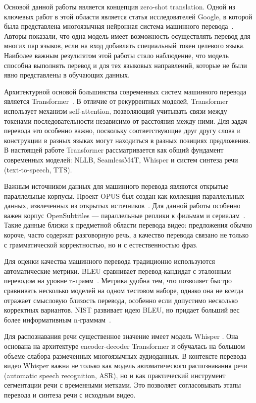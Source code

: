 \documentclass[a4paper,article,14pt]{extarticle}
\begin{document}
\newpage
{}

Основой данной работы является концепция zero-shot translation. Одной из ключевых работ в этой области является статья исследователей Google, в которой была представлена многоязычная нейронная система машинного перевода~\cite{Google}. Авторы показали, что одна модель имеет возможность осуществлять перевод для многих пар языков, если на вход добавлять специальный токен целевого языка. Наиболее важным результатом этой работы стало наблюдение, что модель способна выполнять перевод и для тех языковых направлений, которые не были явно представлены в обучающих данных.

Архитектурной основой большинства современных систем машинного перевода является Transformer~\cite{Attention}. В отличие от рекуррентных моделей, Transformer использует механизм self-attention, позволяющий учитывать связи между токенами последовательности независимо от расстояния между ними. Для задач перевода это особенно важно, поскольку соответствующие друг другу слова и конструкции в разных языках могут находиться в разных позициях предложения. В настоящей работе Transformer рассматривается как общий фундамент современных моделей: NLLB, SeamlessM4T, Whisper и систем синтеза речи (text-to-speech, TTS).

Важным источником данных для машинного перевода являются открытые параллельные корпусы. Проект OPUS был создан как коллекция параллельных данных, извлеченных из открытых источников~\cite{opus_1}. Для данной работы особенно важен корпус OpenSubtitles --- параллельные реплики к фильмам и сериалам~\cite{opus_2}. Такие данные близки к предметной области перевода видео: предложения обычно короче, часто содержат разговорную речь, а качество перевода связано не только с грамматической корректностью, но и с естественностью фраз.

Для оценки качества машинного перевода традиционно используются автоматические метрики. BLEU сравнивает перевод-кандидат с эталонным переводом на уровне n-грамм~\cite{bleu}. Метрика удобна тем, что позволяет быстро сравнивать несколько моделей на одном тестовом наборе, однако она не всегда отражает смысловую близость перевода, особенно если допустимо несколько корректных вариантов. NIST развивает идею BLEU, но придает больший вес более информативным n-граммам~\cite{nist}.

Для распознавания речи существенное значение имеет модель \foreignlanguage{english}{Whisper} \cite{Whisper}. Она основана на архитектуре encoder-decoder Transformer и обучалась на большом объеме слабора размеченных многоязычных аудиоданных. В контексте перевода видео Whisper важна не только как модель автоматического распознавания речи (automatic speech recognition, ASR), но и как практический инструмент сегментации речи с временными метками. Это позволяет согласовывать этапы перевода и синтеза речи с исходным видео.
\end{document}
